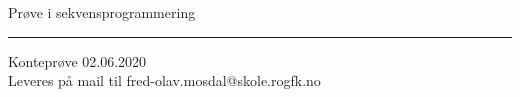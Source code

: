 \centerline{Prøve i sekvensprogrammering}  \bigskip


\bigskip 
\hrule
\bigskip 
\bigskip 
Konteprøve 02.06.2020\\
Leveres på mail til fred-olav.mosdal@skole.rogfk.no
\vfil \eject

